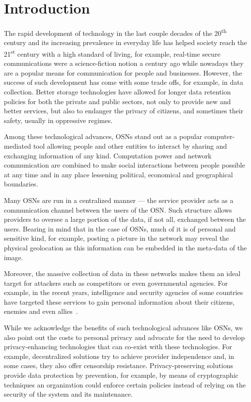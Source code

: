\section{Introduction}
\label{Introduction}
The rapid development of technology in the last couple decades of the 20\textsuperscript{th} 
century and its increasing prevalence in everyday life has helped society reach 
the 21\textsuperscript{st} century with a high standard of living, for example, 
real-time secure communications were a science-fiction notion a century ago while 
nowadays they are a popular means for communication for people and businesses. 
However, the success of such development has come with some trade offs, for example, 
in data collection. Better storage technologies have allowed for longer data retention 
policies for both the private and public sectors, not only to provide new and better 
services, but also to endanger the privacy of citizens, and sometimes their safety, 
usually in oppressive regimes.

Among these technological advances, \acp{OSN} stand out as a popular computer-mediated 
tool allowing people and other entities to interact by sharing and exchanging information 
of any kind. Computation power and network communication are combined to make social 
interactions between people possible at any time and in any place lessening political, 
economical and geographical boundaries.

Many \acp{OSN} are run in a centralized manner --- the service provider acts as 
a communication channel between the users of the \ac{OSN}. Such structure allows 
providers to oversee a large portion of the data, if not all, exchanged between 
the users. Bearing in mind that in the case of \acp{OSN}, much of it is of personal 
and sensitive kind, for example, posting a picture in the network may reveal the 
physical geolocation as this information can be embedded in the meta-data of the 
image.

Moreover, the massive collection of data in these networks makes them an ideal target 
for attackers such as competitors or even governmental agencies. For example, in 
the recent years, intelligence and security agencies of some countries have targeted 
these services to gain personal information about their citizens, enemies and even 
allies~\cite{Prism}.

While we acknowledge the benefits of such technological advances like \acp{OSN}, 
we also point out the costs to personal privacy and advocate for the need to develop 
privacy-enhancing technologies that can co-exist with these technologies. For example, 
decentralized solutions try to achieve provider independence and, in some cases, 
they also offer censorship resistance. Privacy-preserving solutions provide data 
protection by prevention, for example, by means of cryptographic techniques an organization 
could enforce certain policies instead of relying on the security of the system and its maintenance.

